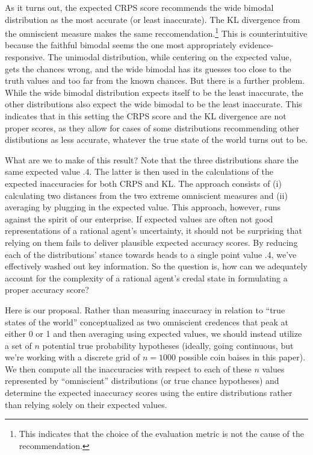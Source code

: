 \documentclass[
  letterpaper,
  DIV=11,
  numbers=noendperiod]{scrartcl}
\begin{document}
As it turns out, the expected CRPS score recommends the wide bimodal
distribution as the most accurate (or least inaccurate). The KL
divergence from the omniscient measure makes the same
reccomendation.\footnote{This indicates that the choice of the
  evaluation metric is not the cause of the recommendation.} This is
counterintuitive because the faithful bimodal seems the one most
appropriately evidence-responsive. The unimodal distribution, while
centering on the expected value, gets the chances wrong, and the wide
bimodal has its guesses too close to the truth values and too far from
the known chances. But there is a further problem. While the wide
bimodal distribution expects itself to be the least inaccurate, the
other distributions also expect the wide bimodal to be the least
inaccurate. This indicates that in this setting the CRPS score and the
KL divergence are not proper scores, as they allow for cases of some
distributions recommending other distibutions as less accurate, whatever
the true state of the world turns out to be.

What are we to make of this result? Note that the three distributions
share the same expected value \(.4\). The latter is then used in the
calculations of the expected inaccuracies for both CRPS and KL. The
approach consists of (i) calculating two distances from the two extreme
omniscient measures and (ii) averaging by plugging in the expected
value. This approach, however, runs against the spirit of our
enterprise. If expected values are often not good representations of a
rational agent's uncertainty, it should not be surprising that relying
on them fails to deliver plausible expected accuracy scores. By reducing
each of the distributions' stance towards heads to a single point value
.4, we've effectively washed out key information. So the question is,
how can we adequately account for the complexity of a rational agent's
credal state in formulating a proper accuracy score?

Here is our proposal. Rather than measuring inaccuracy in relation to
``true states of the world'' conceptualized as two omniscient credences
that peak at either 0 or 1 and then averaging using expected values, we
should instead utilize a set of \(n\) potential true probability
hypotheses (ideally, going continuous, but we're working with a discrete
grid of \(n=1000\) possible coin baises in this paper). We then compute
all the inaccuracies with respect to each of these \(n\) values
represented by ``omniscient'' distributions (or true chance hypotheses)
and determine the expected inaccuracy scores using the entire
distributions rather than relying solely on their expected values.
\end{document}
